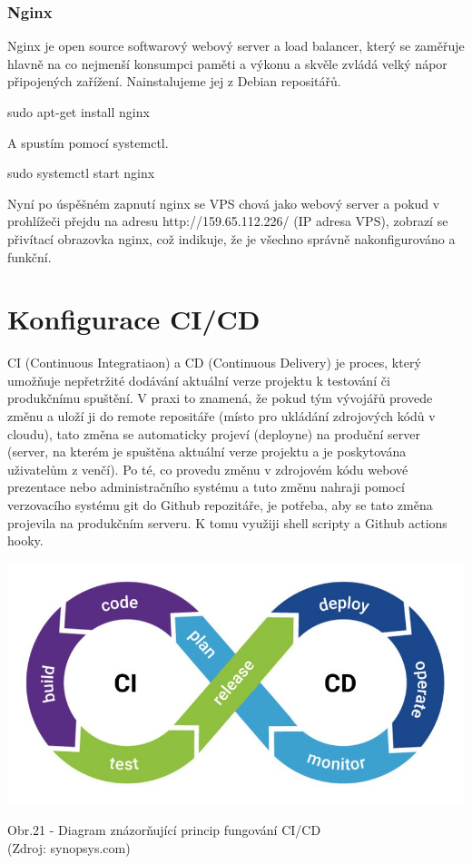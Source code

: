 \documentclass[12pt,a4paper]{report}
\begin{document}
  \subsubsection{Nginx}
  Nginx je open source softwarový webový server a load balancer, který se zaměřuje hlavně na co
  nejmenší konsumpci paměti a výkonu a skvěle zvládá velký nápor připojených zařížení.
  Nainstalujeme jej z Debian repositářů.
  \begin{bash}
    sudo apt-get install nginx
  \end{bash}
  A spustím pomocí systemctl.
  \begin{bash}
    sudo systemctl start nginx
  \end{bash}
  Nyní po úspěšném zapnutí nginx se VPS chová jako webový server a pokud v prohlížeči přejdu na adresu http://159.65.112.226/ (IP adresa VPS), zobrazí se přivítací obrazovka nginx, což indikuje, že je všechno správně nakonfigurováno a funkční. 
  
  \section{Konfigurace CI/CD}
  CI (Continuous Integratiaon) a CD (Continuous Delivery) je proces, který umožňuje nepřetržité 
  dodávání aktuální verze projektu k testování či produkčnímu spuštění. V praxi to znamená,
  že pokud tým vývojářů provede změnu a uloží ji do remote repositáře
  (místo pro ukládání zdrojových kódů v cloudu), tato změna se automaticky projeví (deployne)
  na produční server (server, na kterém je spuštěna aktuální verze projektu a je poskytována
  uživatelům z venčí).
  Po té, co provedu změnu v zdrojovém kódu webové prezentace nebo administračního systému a 
  tuto změnu nahraji pomocí verzovacího systému git do Github repozitáře, je potřeba, aby se 
  tato změna projevila na produkčním serveru. K tomu využiji shell scripty a Github actions hooky.

  \vspace*{0.5cm}
  \noindent\includegraphics[width=\linewidth]{CICD.jpg}
  \begin{center}
    Obr.21 - Diagram znázorňující princip fungování CI/CD  \\
    (Zdroj: synopsys.com)
  \end{center}
  \vspace*{0.5cm}
\end{document}
